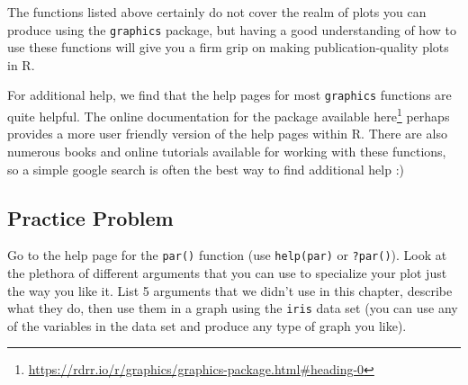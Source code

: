 \documentclass[
]{krantz}
\renewcommand{\href}[2]{#2\footnote{\url{#1}}}
\begin{document}
The functions listed above certainly do not cover the realm of plots you can produce using the \texttt{graphics} package, but having a good understanding of how to use these functions will give you a firm grip on making publication-quality plots in R.

For additional help, we find that the help pages for most \texttt{graphics} functions are quite helpful. The online documentation for the package available \href{https://rdrr.io/r/graphics/graphics-package.html\#heading-0}{here} perhaps provides a more user friendly version of the help pages within R. There are also numerous books and online tutorials available for working with these functions, so a simple google search is often the best way to find additional help :)

\hypertarget{practice-problem-16}{%
\subsection{Practice Problem}\label{practice-problem-16}}

Go to the help page for the \texttt{par()} function (use \texttt{help(par)} or \texttt{?par()}). Look at the plethora of different arguments that you can use to specialize your plot just the way you like it. List 5 arguments that we didn't use in this chapter, describe what they do, then use them in a graph using the \texttt{iris} data set (you can use any of the variables in the data set and produce any type of graph you like).

  

\backmatter
\printindex
\end{document}
